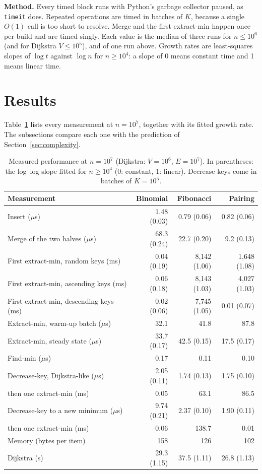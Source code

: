 \documentclass[acmsmall,nonacm]{acmart}
\newcommand{\code}[1]{\texttt{#1}}
\begin{document}
\textbf{Method.} Every timed block runs with Python's garbage collector paused,
as \code{timeit} does. Repeated operations are timed in batches of $K$, because a
single $O(1)$ call is too short to resolve. Merge and the first extract-min
happen once per build and are timed singly. Each value is the median
of three runs for $n \le 10^6$ (and for Dijkstra $V \le 10^5$), and of one run
above. Growth rates are least-squares slopes of $\log t$ against $\log n$ for
$n \ge 10^4$: a slope of 0 means constant time and 1 means linear time.

\section{Results}
\label{sec:results}

Table~\ref{tab:results} lists every measurement at $n = 10^7$, together with
its fitted growth rate. The subsections compare each one with the prediction of
Section~\ref{sec:complexity}.

\begin{table}[t]
\caption{Measured performance at $n = 10^7$ (Dijkstra: $V = 10^6$, $E = 10^7$). In parentheses: the log--log slope fitted for $n \ge 10^4$ (0: constant, 1: linear). Decrease-keys come in batches of $K = 10^5$.}
\label{tab:results}
\small
\begin{tabular}{@{}lrrr@{}}
\toprule
Measurement & Binomial & Fibonacci & Pairing \\
\midrule
Insert ($\mu$s) & 1.48 (0.03) & 0.79 (0.06) & 0.82 (0.06) \\
Merge of the two halves ($\mu$s) & 68.3 (0.24) & 22.7 (0.20) & 9.2 (0.13) \\
First extract-min, random keys (ms) & 0.04 (0.19) & 8,142 (1.06) & 1,648 (1.08) \\
First extract-min, ascending keys (ms) & 0.06 (0.18) & 8,143 (1.03) & 4,027 (1.03) \\
First extract-min, descending keys (ms) & 0.02 (0.06) & 7,745 (1.05) & 0.01 (0.07) \\
Extract-min, warm-up batch ($\mu$s) & 32.1 & 41.8 & 87.8 \\
Extract-min, steady state ($\mu$s) & 33.7 (0.17) & 42.5 (0.15) & 17.5 (0.17) \\
Find-min ($\mu$s) & 0.17 & 0.11 & 0.10 \\
Decrease-key, Dijkstra-like ($\mu$s) & 2.05 (0.11) & 1.74 (0.13) & 1.75 (0.10) \\
\quad then one extract-min (ms) & 0.05 & 63.1 & 86.5 \\
Decrease-key to a new minimum ($\mu$s) & 9.74 (0.21) & 2.37 (0.10) & 1.90 (0.11) \\
\quad then one extract-min (ms) & 0.06 & 138.7 & 0.01 \\
Memory (bytes per item) & 158 & 126 & 102 \\
Dijkstra (s) & 29.3 (1.15) & 37.5 (1.11) & 26.8 (1.13) \\
\bottomrule
\end{tabular}
\end{table}
\end{document}
